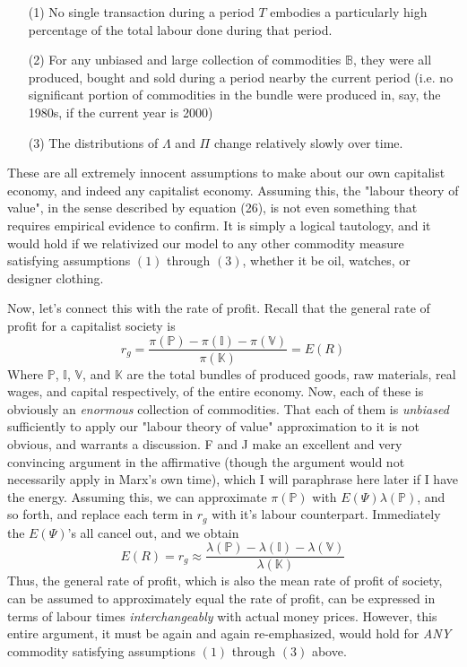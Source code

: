 \begin{itemize}
	\item[(1)] No single transaction during a period $T$ embodies a particularly high percentage of the total labour done during that period.
	\item[(2)] For any unbiased and large collection of commodities $\mathbb{B}$, they were all produced, bought and sold during a period nearby the current period (i.e. no significant portion of commodities in the bundle were produced in, say, the 1980s, if the current year is 2000)
	\item[(3)] The distributions of $\Lambda$ and $\Pi$ change relatively slowly over time. 
\end{itemize}
These are all extremely innocent assumptions to make about our own capitalist economy, and indeed any capitalist economy. Assuming this, the "labour theory of value", in the sense described by equation (26), is not even something that requires empirical evidence to confirm. It is simply a logical tautology, and it would hold if we relativized our model to any other commodity measure satisfying assumptions $(1)$ through $(3)$, whether it be oil, watches, or designer clothing. \par 
Now, let's connect this with the rate of profit. Recall that the general rate of profit for a capitalist society is 
\[ r_g = \frac{\pi(\mathbb{P}) - \pi(\mathbb{I}) - \pi(\mathbb{V})}{\pi(\mathbb{K})} = E(R) \]
Where $\mathbb{P}$, $\mathbb{I}$, $\mathbb{V}$, and $\mathbb{K}$ are the total bundles of produced goods, raw materials, real wages, and capital respectively, of the entire economy. Now, each of these is obviously an \textit{enormous} collection of commodities. That each of them is \textit{unbiased} sufficiently to apply our "labour theory of value" approximation to it is not obvious, and warrants a discussion. F and J make an excellent and very convincing argument in the affirmative (though the argument would not necessarily apply in Marx's own time), which I will paraphrase here later if I have the energy. Assuming this, we can approximate $\pi(\mathbb{P})$ with $E(\Psi)\lambda(\mathbb{P})$, and so forth, and replace each term in $r_g$ with it's labour counterpart. Immediately the $E(\Psi)$'s all cancel out, and we obtain 
\[ E(R) = r_g \approx \frac{\lambda(\mathbb{P}) - \lambda(\mathbb{I}) - \lambda(\mathbb{V})}{\lambda(\mathbb{K})} \] 
Thus, the general rate of profit, which is also the mean rate of profit of society, can be assumed to approximately equal the rate of profit, can be expressed in terms of labour times \textit{interchangeably} with actual money prices.    
However, this entire argument, it must be again and again re-emphasized, would hold for \textit{ANY} commodity satisfying assumptions $(1)$ through $(3)$ above. 

